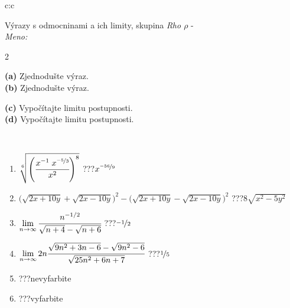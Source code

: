 \documentclass[10pt]{report}
\begin{document}
\begin{tabular}{c:c}
\begin{minipage}[c][104.5mm][t]{0.5\linewidth}
\begin{center}
\vspace{7mm}
{\huge {\Large Výrazy s odmocninami a ich limity}, skupina \textit{Rho $\rho$} -}\\[5mm]
\textit{Meno:}\phantom{xxxxxxxxxxxxxxxxxxxxxxxxxxxxxxxxxxxxxxxxxxxxxxxxxxxxxxxxxxxxxxxxx}\\[5mm]
\begin{minipage}{0.95\linewidth}
\begin{center}
{\small \begin{multicols}{2} \raggedright
\phantom{xxxxxxxxx}\textbf{(a)} Zjednodušte výraz. \\[1mm]
\phantom{xxxxxxxxx}\textbf{(b)} Zjednodušte výraz. \par \columnbreak
\textbf{(c)} Vypočítajte limitu postupnosti. \\[1mm]
\textbf{(d)} Vypočítajte limitu postupnosti.
\end{multicols}
}
\end{center}
\end{minipage}
\\[4mm]
\begin{minipage}{0.79\linewidth}
\begin{center}
\begin{varwidth}{\linewidth}
\begin{enumerate}
\small
\item $\sqrt[6]{\left(\cfrac{x^{-1}\;x^{\nicefrac{-5}{3}}}{x^{2}}\right)^{8}}$\quad \dotfill\; ???\;\dotfill \quad $x^{\nicefrac{-56}{9}}$
\item {\footnotesize{\scriptsize$\big(\sqrt{2x+10y}+\sqrt{2x-10y}\big)^2-\big(\sqrt{2x+10y}-\sqrt{2x-10y}\big)^2$}\quad \dotfill\; ???\;\dotfill \quad $8\sqrt{x^2-5y^2}$}
\item $\lim\limits_{n\to\infty}\cfrac{n^{-1/2}}{\sqrt{n+4}-\sqrt{n+6}}$\quad \dotfill\; ???\;\dotfill \quad $\nicefrac{-1}{2}$
\item $\lim\limits_{n\to\infty}2n\cfrac{\sqrt{9n^2+3n-6}-\sqrt{9n^2-6}}{\sqrt{25n^2+6n+7}}$\quad \dotfill\; ???\;\dotfill \quad $\nicefrac{1}{5}$
\item \quad \dotfill\; ???\;\dotfill \quad nevyfarbite
\item \quad \dotfill\; ???\;\dotfill \quad vyfarbite
\end{enumerate}
\end{varwidth}

\end{center}
\end{minipage}
\end{center}
\end{minipage}
\end{tabular}
\end{document}
